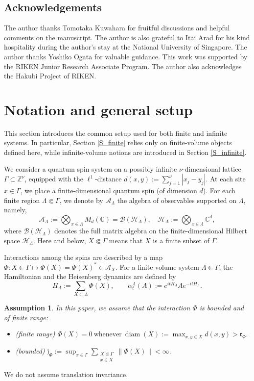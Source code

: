 \documentclass[11pt]{article}
\numberwithin{equation}{section}
\newtheorem{assumption}[theorem]{Assumption}
\begin{document}
\subsection*{Acknowledgements}
The author thanks Tomotaka Kuwahara for fruitful discussions and helpful comments on the manuscript. The author is also grateful to Itai Arad for his kind hospitality during the author's stay at the National University of Singapore. The author thanks Yoshiko Ogata for valuable guidance. This work was supported by the RIKEN Junior Research Associate Program. The author also acknowledges the Hakubi Project of RIKEN.

\section{Notation and general setup}\label{S_notation}

This section introduces the common setup used for both finite and infinite systems. In particular, Section \ref{S_finite} relies only on finite-volume objects defined here, while infinite-volume notions are introduced in Section \ref{S_infinite}.

We consider a quantum spin system on a possibly infinite $\nu$-dimensional lattice $\Gamma\subset\mathbb{Z}^\nu$, equipped with the $\ell^1$-distance $d(x,y):=\sum_{j=1}^\nu |x_j-y_j|$. At each site $x\in\Gamma$, we place a finite-dimensional quantum spin (of dimension $d$). For each finite region $\Lambda\Subset\Gamma$, we denote by $\mathcal{A}_\Lambda$ the algebra of observables supported on $\Lambda$, namely, 
\[
\mathcal{A}_\Lambda
:=\bigotimes_{x\in \Lambda} M_d(\mathbb{C})
=\mathcal{B}(\mathcal{H}_\Lambda),\quad
\mathcal{H}_\Lambda:=\bigotimes_{x\in \Lambda}\mathbb{C}^d,
\]
where $\mathcal{B}(\mathcal{H}_\Lambda)$ denotes the full matrix algebra on the finite-dimensional Hilbert space $\mathcal{H}_\Lambda$. Here and below, $X\Subset\Gamma$ means that $X$ is a finite subset of $\Gamma$.

Interactions among the spins are described by a map $\Phi:X\Subset\Gamma\mapsto\Phi(X)=\Phi(X)^*\in\mathcal{A}_X$. For a finite-volume system $\Lambda\Subset\Gamma$, the Hamiltonian and the Heisenberg dynamics are defined by
\[
H_\Lambda:=\sum_{X\subset\Lambda} \Phi(X),\qquad
\alpha_t^\Lambda(A):=e^{itH_\Lambda}Ae^{-itH_\Lambda}.
\]
\begin{assumption}\label{ass_interaction}
In this paper, we assume that the interaction $\Phi$ is bounded and of finite range:
\begin{itemize}
\item (finite range)
\(
\Phi(X)=0 \ \text{whenever}\ 
\operatorname{diam}(X):=\max_{x,y\in X} d(x,y)>\mathfrak{r}_\Phi.
\)
\item (bounded)
\(
\mathfrak{j}_\Phi:=\sup_{x\in\Gamma}
\sum_{\substack{X\Subset\Gamma\\ x\in X}} \|\Phi(X)\|<\infty.
\)
\end{itemize}
\end{assumption}
We do not assume translation invariance.
\end{document}
